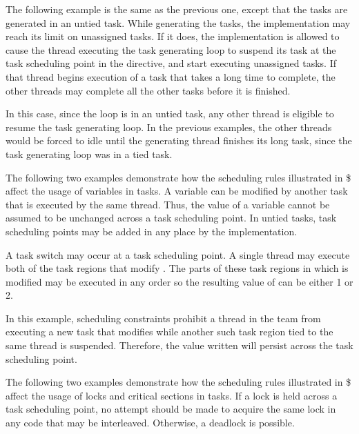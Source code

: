 \pagebreak
{}

The following example is the same as the previous one, except that the tasks are 
generated in an untied task. While generating the tasks, the implementation may 
reach its limit on unassigned tasks. If it does, the implementation is allowed 
to cause the thread executing the task generating loop to suspend its task at the 
task scheduling point in the  directive, and start executing unassigned 
tasks.  If that thread begins execution of a task that takes a long time to complete, 
the other threads may complete all the other tasks before it is finished.

In this case, since the loop is in an untied task, any other thread is eligible 
to resume the task generating loop. In the previous examples, the other threads 
would be forced to idle until the generating thread finishes its long task, since 
the task generating loop was in a tied task.



The following two examples demonstrate how the scheduling rules illustrated in 
\$ affect the usage of  variables in tasks. A  
variable can be modified by another task that is executed by the same thread. Thus, 
the value of a  variable cannot be assumed to be unchanged 
across a task scheduling point. In untied tasks, task scheduling points may be 
added in any place by the implementation.

A task switch may occur at a task scheduling point. A single thread may execute 
both of the task regions that modify . The parts of these task regions 
in which  is modified may be executed in any order so the resulting 
value of  can be either 1 or 2.




In this example, scheduling constraints prohibit a thread in the team from executing 
a new task that modifies   while another such task region tied to the 
same thread is suspended. Therefore, the value written will persist across the 
task scheduling point.




The following two examples demonstrate how the scheduling rules illustrated in 
\$ affect the usage of locks and critical sections in tasks.  If a lock is held 
across a task scheduling point, no attempt should be made to acquire the same lock 
in any code that may be interleaved.  Otherwise, a deadlock is possible.

